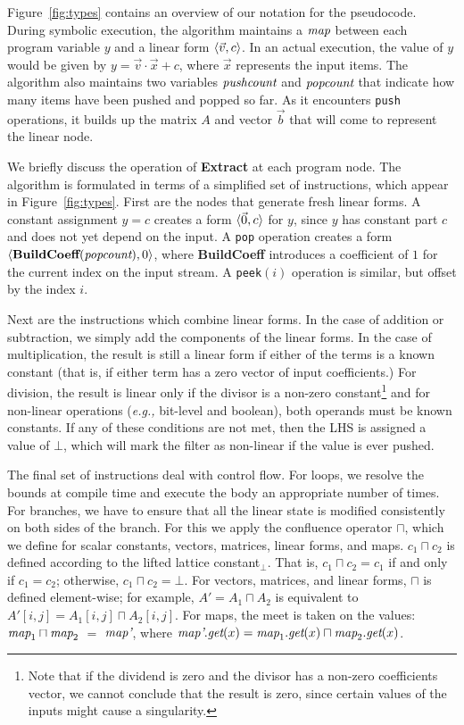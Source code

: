Figure~\ref{fig:types} contains an overview of our notation for the
pseudocode.  During symbolic execution, the algorithm maintains a
$\mbox{\it map}$ between each program variable $y$ and a linear form
$\langle{{\vec v}}, {c}\rangle$. In an actual execution, the value of $y$ would be
given by $y = {\vec v} \cdot {\vec x} + c$, where ${\vec x}$
represents the input items.  The algorithm also maintains two
variables $\mbox{\it pushcount}$ and $\mbox{\it popcount}$ that indicate how many
items have been pushed and popped so far.  As it encounters {\tt push}
operations, it builds up the matrix $A$ and vector ${\vec b}$ that
will come to represent the linear node.

We briefly discuss the operation of {\bf Extract} at each program
node.  The algorithm is formulated in terms of a simplified set of
instructions, which appear in Figure~\ref{fig:types}.  First are the
nodes that generate fresh linear forms.  A constant assignment $y = c$
creates a form $\langle{\vec 0}, {c}\rangle$ for $y$, since $y$ has constant part
$c$ and does not yet depend on the input.  A {\tt pop} operation
creates a form $\langle{\mbox{\bf BuildCoeff}(\mbox{\it popcount})}, {0}\rangle$, where
{\bf BuildCoeff} introduces a coefficient of $1$ for the current index
on the input stream.  A {\tt peek}$(i)$ operation is similar, but
offset by the index $i$.

Next are the instructions which combine linear forms.  In the case of
addition or subtraction, we simply add the components of the linear
forms.  In the case of multiplication, the result is still a linear
form if either of the terms is a known constant (that is, if either
term has a zero vector of input coefficients.)  For division, the
result is linear only if the divisor is a non-zero
constant\footnote{Note that if the dividend is zero and the divisor
has a non-zero coefficients vector, we cannot conclude that the
result is zero, since certain values of the inputs might cause a
singularity.} and for non-linear operations ({\it e.g.,} bit-level and
boolean), both operands must be known constants.  If any of these
conditions are not met, then the LHS is assigned a value of $\bot$,
which will mark the filter as non-linear if the value is ever pushed.

The final set of instructions deal with control flow.  For loops, we
resolve the bounds at compile time and execute the body an appropriate
number of times.  For branches, we have to ensure that all the linear
state is modified consistently on both sides of the branch.  For this
we apply the confluence operator $\sqcap$, which we define for scalar
constants, vectors, matrices, linear forms, and maps.  $c_1 \sqcap
c_2$ is defined according to the lifted lattice constant$_{\bot}$.
That is, $c_1 \sqcap c_2 = c_1$ if and only if $c_1 = c_2$; otherwise,
$c_1 \sqcap c_2 = \bot$.  For vectors, matrices, and linear forms,
$\sqcap$ is defined element-wise; for example, $A' = A_1 \sqcap A_2$
is equivalent to $A'[i,j] = A_1[i,j] \sqcap A_2[i,j]$.  For maps, the
meet is taken on the values: $\mbox{\it map}_1 \sqcap \mbox{\it map}_2$ $=$
$\mbox{\it map'}$, where $\mbox{\it map'}.\mbox{\it get}(x) = \mbox{\it map}_1.\mbox{\it get}(x)
\sqcap \mbox{\it map}_2.\mbox{\it get}(x)$.

